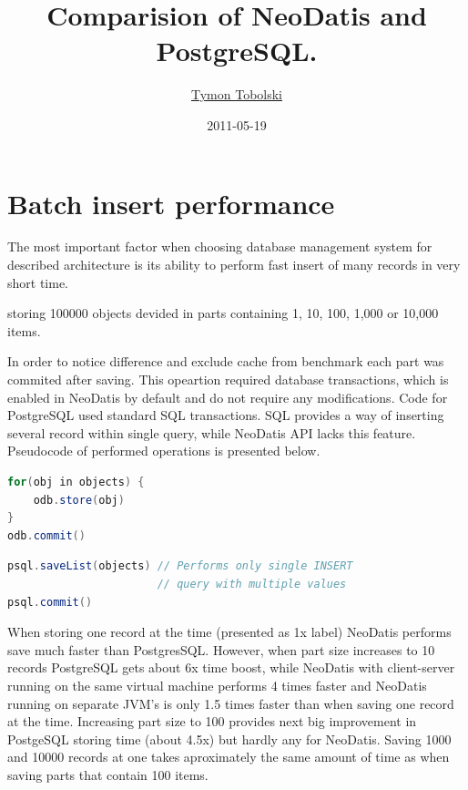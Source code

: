 \documentclass[a4paper,titlepage,12pt]{article}
\title{Comparision of NeoDatis and PostgreSQL.}
\author{\href{mailto:i@teamon.eu}{Tymon Tobolski}}
\date{2011-05-19}
\begin{document}
\maketitle
\tableofcontents


\section{Batch insert performance}\label{sec:batch_insert}


The most important factor when choosing database management system for described architecture is its ability to perform fast insert of many records in very short time.

storing 100000 objects devided in parts containing 1, 10, 100, 1,000 or 10,000 items.

In order to notice difference and exclude cache from benchmark each part was commited after saving. This opeartion required database transactions, which is enabled in NeoDatis by default and do not require any modifications. Code for PostgreSQL used standard SQL transactions. SQL provides a way of inserting several record within single query, while NeoDatis API lacks this feature. Pseudocode of performed operations is presented below.

\begin{lstlisting}[language=Java, caption=NeoDatis code]
for(obj in objects) {
    odb.store(obj)
}
odb.commit()
\end{lstlisting}

\begin{lstlisting}[language=Java, caption=PostgeSQL code]
psql.saveList(objects) // Performs only single INSERT 
                       // query with multiple values
psql.commit()
\end{lstlisting}



When storing one record at the time (presented as 1x label) NeoDatis performs save much faster than PostgresSQL. However, when part size increases to 10 records PostgreSQL gets about 6x time boost, while NeoDatis with client-server running on the same virtual machine performs 4 times faster and NeoDatis running on separate JVM's is only 1.5 times faster than when saving one record at the time. Increasing part size to 100 provides next big improvement in PostgeSQL storing time (about 4.5x) but hardly any for NeoDatis.
Saving 1000 and 10000 records at one takes aproximately the same amount of time as when saving parts that contain 100 items.
\end{document}
